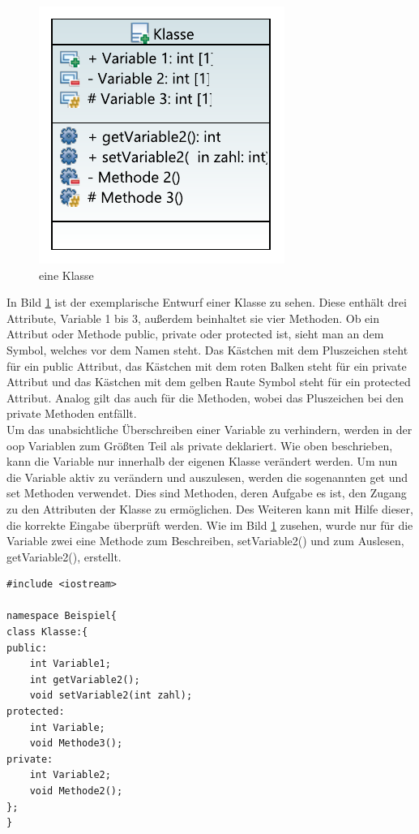 \begin{figure}[H]
	\centering
	\includegraphics[scale=1.2]{bilder/pdfvorlagen/eineKlasse}
	\caption[eine Klasse]{eine Klasse}
	\label{fig:eineklasse}
\end{figure}
 In Bild  \ref{fig:eineklasse} ist der exemplarische Entwurf einer Klasse zu sehen. Diese enthält drei Attribute, Variable 1 bis 3, außerdem beinhaltet sie vier Methoden. Ob ein Attribut oder Methode \glqq public\grqq{},  \glqq private\grqq{} oder \glqq protected\grqq{} ist, sieht man an dem Symbol, welches vor dem Namen steht. Das Kästchen mit dem Pluszeichen steht für ein \glqq public\grqq{} Attribut, das Kästchen mit dem roten Balken steht für ein   \glqq private\grqq{} Attribut und das Kästchen mit dem gelben Raute Symbol steht für ein \glqq protected\grqq{} Attribut. Analog gilt das auch für die Methoden, wobei das Pluszeichen bei den \glqq private\grqq{} Methoden entfällt. \\
 Um das unabsichtliche Überschreiben einer Variable zu verhindern, werden in der \acl{oop} Variablen zum Größten Teil als \glqq private\grqq{} deklariert. Wie oben beschrieben, kann die Variable nur innerhalb der eigenen Klasse verändert werden. Um nun die Variable aktiv zu verändern und auszulesen, werden die sogenannten \glqq get\grqq{} und \glqq set\grqq{} Methoden verwendet. Dies sind Methoden, deren Aufgabe es ist, den Zugang zu den Attributen der Klasse zu ermöglichen. Des Weiteren kann mit Hilfe dieser, die korrekte Eingabe überprüft werden. Wie im Bild \ref{fig:eineklasse} zusehen, wurde nur für die Variable zwei eine Methode zum Beschreiben, \glqq setVariable2()\grqq{} und zum Auslesen, \glqq getVariable2()\grqq{}, erstellt.\\
\begin{lstlisting}[caption = Klasse.h,label=klass.h]
#include <iostream>

namespace Beispiel{
class Klasse:{
public:
	int Variable1;
	int getVariable2();
	void setVariable2(int zahl);
protected:
	int Variable;
	void Methode3();
private:
	int Variable2;
	void Methode2();
};
}
\end{lstlisting}
